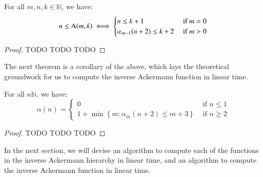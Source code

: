 \begin{thm}  \label{thm: inv_ack_ack}
For all $m, n, k \in \mathbb{N}$, we have:
\begin{equation}
n \le \text{A}(m, k) \iff \begin{cases}
n \le k + 1 & \text{ if } m = 0 \\ \alpha_{m-1}(n+2) \le k + 2 & \text{ if } m > 0
\end{cases}
\end{equation}
\end{thm}


\begin{proof}
TODO TODO TODO
\end{proof}

The next theorem is a corollary of the above, which lays the theoretical groundwork for us to compute the inverse Ackermann function in linear time.

\begin{thm}
For all $n\mathbb{N}$, we have:
\begin{equation}
\alpha(n) = \begin{cases}
0 & \text{ if } n \le 1 \\
1 + \min\left\{ m: \alpha_m(n+2) \le m + 3 \right\} & \text{ if } n \ge 2
\end{cases}
\end{equation}
\end{thm}

\begin{proof}
TODO TODO TODO
\end{proof}

In the next section, we will devise an algorithm to compute each of the functions in the inverse Ackermann hierarchy in linear time, and an algorithm to compute the inverse Ackermann function in linear time.
